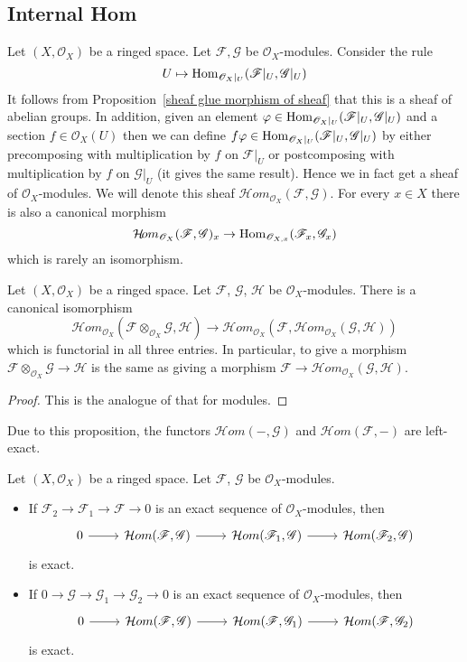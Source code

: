\subsection{Internal Hom}
Let $(X,\mathscr{O}_X)$ be a ringed space. Let $\mathscr{F},\mathscr{G}$ be $\mathscr{O}_X$-modules. Consider the rule
\[U\mapsto\mathrm{Hom}_{\mathscr{O}_X|_U}(\mathscr{F}|_U,\mathscr{G}|_U)\]
It follows from Proposition~\ref{sheaf glue morphism of sheaf} that this is a sheaf of abelian groups. In addition, given an element $\varphi\in\mathrm{Hom}_{\mathscr{O}_X|_U}(\mathscr{F}|_U,\mathscr{G}|_U)$ and a section $f\in\mathscr{O}_X(U)$ then we can define $f\varphi\in\mathrm{Hom}_{\mathscr{O}_X|_U}(\mathscr{F}|_U,\mathscr{G}|_U)$ by either precomposing with multiplication by $f$ on $\mathscr{F}|_U$ or postcomposing with multiplication by $f$ on $\mathscr{G}|_U$ (it gives the same result). Hence we in fact get a sheaf of $\mathscr{O}_X$-modules. We will denote this sheaf $\mathcal{H}om_{\mathscr{O}_X}(\mathscr{F},\mathscr{G})$. For every $x\in X$ there is also a canonical morphism
\[\mathcal{H}\!om_{\mathscr{O}_X}(\mathscr{F},\mathscr{G})_x\to \mathrm{Hom}_{\mathscr{O}_{X,x}}(\mathscr{F}_x,\mathscr{G}_x)\]
which is rarely an isomorphism.
\begin{proposition}
Let $(X,\mathscr{O}_X)$ be a ringed space. Let $\mathscr{F}$, $\mathscr{G}$, $\mathscr{H}$ be $\mathscr{O}_X$-modules. There is a canonical isomorphism
\[\mathcal{H}om_{\mathscr{O}_X}(\mathscr{F}\otimes_{\mathscr{O}_X}\mathscr{G},\mathscr{H})\to \mathcal{H}om_{\mathscr{O}_X}(\mathscr{F},\mathcal{H}om_{\mathscr{O}_X}(\mathscr{G},\mathscr{H}))\]
which is functorial in all three entries. In particular, to give a morphism $\mathscr{F}\otimes_{\mathscr{O}_X}\mathscr{G}\to\mathscr{H}$ is the same as giving a morphism $\mathscr{F}\to\mathcal{H}om_{\mathscr{O}_X}(\mathscr{G},\mathscr{H})$.
\end{proposition}
\begin{proof}
This is the analogue of that for modules.
\end{proof}
Due to this proposition, the functors $\mathcal{H}om(-,\mathscr{G})$ and $\mathcal{H}om(\mathscr{F},-)$ are left-exact.
\begin{proposition}
Let $(X,\mathscr{O}_X)$ be a ringed space. Let $\mathscr{F}$, $\mathscr{G}$ be $\mathscr{O}_X$-modules.
\begin{itemize}
\item If $\mathscr{F}_2\to\mathscr{F}_1\to\mathscr{F}\to 0$ is an exact sequence of $\mathscr{O}_X$-modules, then
\[\begin{tikzcd}
0\ar[r]&\mathcal{H}om(\mathscr{F},\mathscr{G})\ar[r]&\mathcal{H}om(\mathscr{F}_1,\mathscr{G})\ar[r]&\mathcal{H}om(\mathscr{F}_2,\mathscr{G})
\end{tikzcd}\]
is exact.
\item If $0\to\mathscr{G}\to\mathscr{G}_1\to\mathscr{G}_2\to 0$ is an exact sequence of $\mathscr{O}_X$-modules, then
\[\begin{tikzcd}
0\ar[r]&\mathcal{H}om(\mathscr{F},\mathscr{G})\ar[r]&\mathcal{H}om(\mathscr{F},\mathscr{G}_1)\ar[r]&\mathcal{H}om(\mathscr{F},\mathscr{G}_2)
\end{tikzcd}\]
is exact.
\end{itemize}
\end{proposition}
